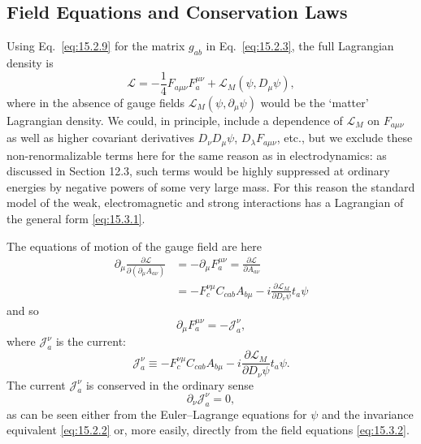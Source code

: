 
\subsection{Field Equations and Conservation Laws}
\label{sec:15.3}

Using Eq.~\eqref{eq:15.2.9} for the matrix $g_{ab}$ in
Eq.~\eqref{eq:15.2.3}, the full Lagrangian density is
\begin{equation}
 \mathcal L=-\frac14F_{a\mu\nu}F_a^{\mu\nu}
 +\mathcal L_M(\psi,D_\mu\psi) ,
 \tag{15.3.1}\label{eq:15.3.1}
\end{equation}
where in the absence of gauge fields $\mathcal L_M(\psi,\partial_\mu\psi)$ would
be the `matter' Lagrangian density. We could, in principle, include a dependence
of $\mathcal L_M$ on $F_{a\mu\nu}$ as well as higher covariant derivatives
$D_\nu D_\mu\psi$, $D_\lambda F_{a\mu\nu}$, etc., but we exclude these
non-renormalizable terms here for the same reason as in electrodynamics: as
discussed in Section 12.3, such terms would be highly suppressed at ordinary
energies by negative powers of some very large mass. For this reason the standard
model of the weak, electromagnetic and strong interactions has a Lagrangian of
the general form \eqref{eq:15.3.1}.

The equations of motion of the gauge field are here
\begin{align*}
 \partial_\mu\frac{\partial\mathcal L}{\partial(\partial_\mu A_{a\nu})}
 &=-\partial_\mu F_a^{\mu\nu}
 =\frac{\partial\mathcal L}{\partial A_{a\nu}}\\
 &=-F_c^{\nu\mu}C_{cab}A_{b\mu}
 -i\frac{\partial\mathcal L_M}{\partial D_\nu\psi}t_a\psi
\end{align*}
and so
\begin{equation}
 \partial_\mu F_a^{\mu\nu}=-\mathcal J_a^\nu ,
 \tag{15.3.2}\label{eq:15.3.2}
\end{equation}
where $\mathcal J_a^\nu$ is the current:
\begin{equation}
 \mathcal J_a^\nu\equiv
 -F_c^{\nu\mu}C_{cab}A_{b\mu}
 -i\frac{\partial\mathcal L_M}{\partial D_\nu\psi}t_a\psi .
 \tag{15.3.3}\label{eq:15.3.3}
\end{equation}
The current $\mathcal J_a^\nu$ is conserved in the ordinary sense
\begin{equation}
 \partial_\nu\mathcal J_a^\nu=0 ,
 \tag{15.3.4}\label{eq:15.3.4}
\end{equation}
as can be seen either from the Euler--Lagrange equations for $\psi$ and the
invariance equivalent \eqref{eq:15.2.2} or, more easily, directly from the field
equations \eqref{eq:15.3.2}.

